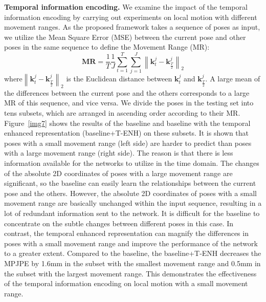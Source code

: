\documentclass[sigconf]{acmart}
\begin{document}
\textbf{Temporal information encoding.} We examine the impact of the temporal information encoding by carrying out experiments on local motion with different movement ranges. As the proposed framework takes a sequence of poses as input, we utilize the Mean Square Error (MSE) between the current pose and other poses in the same sequence to define the Movement Range (MR):
\begin{equation}
\mathbf{MR}=\frac{1}{T}\frac{1}{J}\sum\limits_{t=1}^{T}\sum\limits_{j=1}^{J}\left\|\mathbf{k}_{t}^{j}-\mathbf{k}_{\frac{T}{2}}^{j}\right\|_{2}
\end{equation}
where$\left\|\mathbf{k}_{t}^{j}-\mathbf{k}_{\frac{T}{2}}^{j}\right\|_{2}$ is the Euclidean distance between $\mathbf{k}_{t}^{j}$ and $\mathbf{k}_{\frac{T}{2}}^{j}$. A large mean of the differences between the current pose and the others corresponds to a large MR of this sequence, and vice versa. We divide the poses in the testing set into tens subsets, which are arranged in ascending order according to their MR. Figure~\ref{img7} shows the results of the baseline and baseline with the temporal enhanced representation (baseline+T-ENH) on these subsets. It is shown that poses with a small movement range (left side) are harder to predict than poses with a large movement range (right side). The reason is that there is less information available for the networks to utilize in the time domain. The changes of the absolute 2D coordinates of poses with a large movement range are significant, so the baseline can easily learn the relationships between the current pose and the others. However, the absolute 2D coordinates of poses with a small movement range are basically unchanged within the input sequence, resulting in a lot of redundant information sent to the network. It is difficult for the baseline to concentrate on the subtle changes between different poses in this case. In contrast, the temporal enhanced representation can magnify the differences in poses with a small movement range and improve the performance of the network to a greater extent. Compared to the baseline, the baseline+T-ENH decreases the MPJPE by 1.6mm in the subset with the smallest movement range and 0.5mm in the subset with the largest movement range. This demonstrates the effectiveness of the temporal information encoding on local motion with a small movement range.
\end{document}

